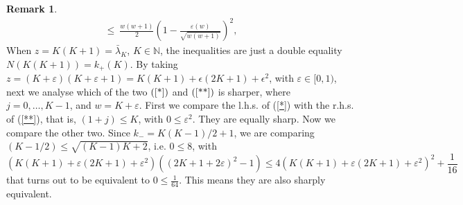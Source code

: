 \documentclass[11pt,a4paper,times]{amsart}
\theoremstyle{plain}
\theoremstyle{definition}
\newtheorem{remark}{Remark}[section]
\numberwithin{equation}{section}
\newcommand{\N}{\mathbb{N}}
\begin{document}
{\begin{remark}
\begin{gather}
 \leq~ \frac{w(w+1)}{2}\left(1-\frac{\varepsilon(w)}{\sqrt{w(w+1)}}\right)^2, \quad\quad \label{**}
 \end{gather}
When $z=K(K+1)=\bar{\lambda}_K$, $K\in \N$, the inequalities are just a double equality $N(K(K+1))=k_+(K)$. By taking $z=(K+\varepsilon)(K+\varepsilon +1)= K(K+1)+\epsilon(2K+1)+\epsilon^2$,
with $\varepsilon\in [0,1)$,   
next we analyse which of the two $(\ref{*})$ and $(\ref{**})$ is sharper, where $j=0, \ldots, K-1$, and $w=K+\varepsilon$. First we compare the l.h.s. of (\ref{*})
with the r.h.s. of (\ref{**}),
that is, 
$(1+j)\leq K$, with   $ 0\leq  \varepsilon^2$. They are equally sharp.
Now  we compare the other two.
Since $k_-=K(K-1)/2 +1$, we are comparing 
$(K-1/2)\leq \sqrt{(K-1)K+2}$, i.e. $0\leq 8$, with
\[(K(K+1)+\varepsilon(2K+1)+\varepsilon^2)\left((2K+1+2\varepsilon)^2-1\right)\leq
4\left(K(K+1)+\varepsilon(2K+1)+\varepsilon^2\right)^2+\frac{1}{16}\]
that turns out to be equivalent to $0\leq \frac{1}{64}$. 
This means they are also sharply equivalent.
\end{remark} 
\noindent
}
\end{document}
